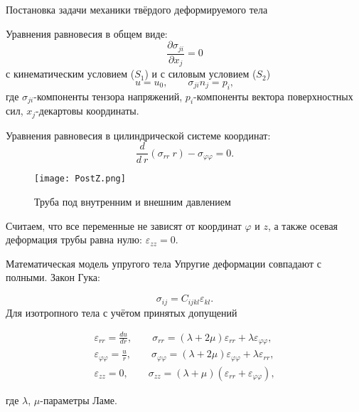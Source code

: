 \documentclass{beamer}
\begin{document}
\begin{frame}{Постановка задачи механики твёрдого деформируемого тела}
\begin{multicols}{2}
\small
Уравнения равновесия в общем виде:
\begin{equation*}
\frac{\partial \sigma_{ji}}{\partial x_{j}}=0
\end{equation*}
с кинематическим условием ($S_{1}$) и с силовым условием ($S_{2}$)
\begin{equation*}
u=u_{0}, \qquad \sigma_{ji} n_{j}=p_{i},
\end{equation*}
где $\sigma_{ji}$-компоненты тензора напряжений, $p_i$-компоненты вектора поверхностных сил, $x_{j}$-декартовы координаты. 

Уравнения равновесия в цилиндрической системе координат:
\begin{equation*}
\frac{d}{d\:r}(\sigma_{rr}\: r)-\sigma_{\varphi\varphi}=0.
\end{equation*}
\columnbreak

\begin{figure}[h]
\centering
\texttt{[image: PostZ.png]}
\captionsetup{font=tiny}
\caption{Труба под внутренним и внешним давлением}
\end{figure}
 \vspace{-1em}
Считаем, что все переменные не зависят от координат $\varphi$ и $z$, а также осевая деформация трубы равна нулю: $\varepsilon_{zz}=0$.
\end{multicols}
\end{frame}

\begin{frame}{Математическая модель упругого тела}
\small
Упругие деформации совпадают с полными. Закон Гука:

\begin{equation*}
\sigma_{ij}=C_{ijkl}\varepsilon_{kl}.
\end{equation*}
Для изотропного тела с учётом принятых допущений

\begin{equation*}
\begin{split}
\varepsilon_{rr}=\frac{du}{dr}, \qquad \sigma_{rr}=(\lambda+2\mu)\varepsilon_{rr}+\lambda\varepsilon_{\varphi\varphi}, \\
\varepsilon_{\varphi\varphi}=\frac{u}{r}, \qquad \sigma_{\varphi\varphi}=(\lambda+2\mu)\varepsilon_{\varphi\varphi}+\lambda\varepsilon_{rr}, \\ 
\varepsilon_{zz}=0, \qquad \sigma_{zz}=\left(\lambda+\mu\right)(\varepsilon_{rr}+\varepsilon_{\varphi\varphi}),
\end{split}
\end{equation*}

где $\lambda$, $\mu$-параметры Ламе.

\end{frame}
\end{document}
